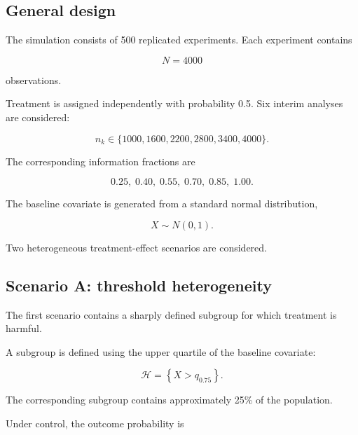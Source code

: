 \documentclass[11pt,a4paper]{article}
\begin{document}
\subsection{General design}

The simulation consists of 500 replicated experiments. Each experiment
contains

\begin{equation}
N=4000
\end{equation}

observations.

Treatment is assigned independently with probability 0.5. Six interim
analyses are considered:

\begin{equation}
n_k
\in
\{
1000,
1600,
2200,
2800,
3400,
4000
\}.
\end{equation}

The corresponding information fractions are

\begin{equation}
0.25,\;0.40,\;0.55,\;0.70,\;0.85,\;1.00.
\end{equation}

The baseline covariate is generated from a standard normal distribution,

\begin{equation}
X\sim N(0,1).
\end{equation}

Two heterogeneous treatment-effect scenarios are considered.


\subsection{Scenario A: threshold heterogeneity}

The first scenario contains a sharply defined subgroup for which treatment is
harmful.

A subgroup is defined using the upper quartile of the baseline covariate:

\begin{equation}
\mathcal H
=
\left\{
X>q_{0.75}
\right\}.
\end{equation}

The corresponding subgroup contains approximately 25\% of the population.

Under control, the outcome probability is
\end{document}
